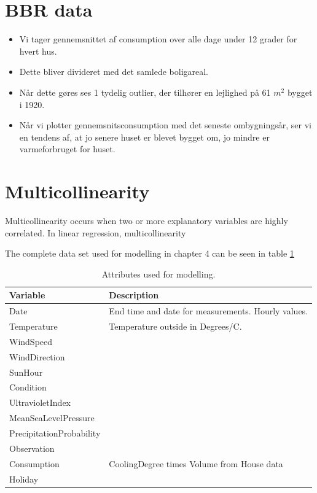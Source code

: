 \section{BBR data}

\begin{itemize}
    \item Vi tager gennemsnittet af consumption over alle dage under 12 grader for hvert hus.
    \item Dette bliver divideret med det samlede boligareal.
    \item Når dette gøres ses 1 tydelig outlier, der tilhører en lejlighed på 61 $m^2$ bygget i 1920.
    \item Når vi plotter gennemsnitsconsumption med det seneste ombygningsår, ser vi en tendens af, at jo senere huset er blevet bygget om, jo mindre er varmeforbruget for huset.
\end{itemize}    

\section{Multicollinearity}
Multicollinearity occurs when two or more explanatory variables are highly correlated. In linear regression, multicollinearity 



\noindent The complete data set used for modelling in chapter 4 can be seen in table \ref{tab: modeldata} 
\begin{table}[H]
    \centering
    \begin{tabular}{ll}
     \hline
     \textbf{Variable} & \textbf{Description} \\
    \hline
    \hline
    Date  &  End time and date for measurements. Hourly values.\\
    Temperature  &  Temperature outside in Degrees/C. \\
    WindSpeed  &  \\
    WindDirection  &  \\
    SunHour  &  \\
    Condition  & \\
    UltravioletIndex  &   \\
    MeanSeaLevelPressure  & \\
    PrecipitationProbability & \\
    Observation & \\
    Consumption & CoolingDegree times Volume from House data \\
    Holiday & \\
    \hline
    \end{tabular}
    \caption{Attributes used for modelling.}
    \label{tab: modeldata}
\end{table}   